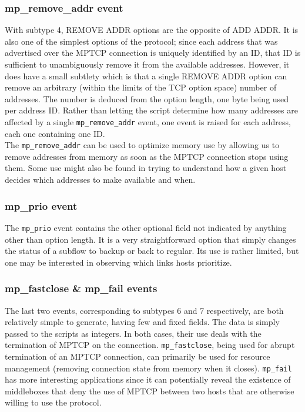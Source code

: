 \subsubsection{mp\_remove\_addr event}
With subtype 4, REMOVE ADDR options are the opposite of ADD ADDR. It is also one of the simplest options of the protocol; since each address that was advertised over the MPTCP connection is uniquely identified by an ID, that ID is sufficient to unambiguously remove it from the available addresses. However, it does have a small subtlety which is that a single REMOVE ADDR option can remove an arbitrary (within the limits of the TCP option space) number of addresses. The number is deduced from the option length, one byte being used per address ID. Rather than letting the script determine how many addresses are affected by a single \texttt{mp\_remove\_addr} event, one event is raised for each address, each one containing one ID. \\

The \texttt{mp\_remove\_addr} can be used to optimize memory use by allowing us to remove addresses from memory as soon as the MPTCP connection stops using them. Some use might also be found in trying to understand how a given host decides which addresses to make available and when.

\subsubsection{mp\_prio event}
The \texttt{mp\_prio} event contains the other optional field not indicated by anything other than option length. It is a very straightforward option that simply changes the status of a subflow to backup or back to regular. Its use is rather limited, but one may be interested in observing which links hosts prioritize.

\subsubsection{mp\_fastclose \& mp\_fail events}
The last two events, corresponding to subtypes 6 and 7 respectively, are both relatively simple to generate, having few and fixed fields. The data is simply passed to the scripts as integers. In both cases, their use deals with the termination of MPTCP on the connection. \texttt{mp\_fastclose}, being used for abrupt termination of an MPTCP connection, can primarily be used for resource management (removing connection state from memory when it closes). \texttt{mp\_fail} has more interesting applications since it can potentially reveal the existence of middleboxes that deny the use of MPTCP between two hosts that are otherwise willing to use the protocol.
